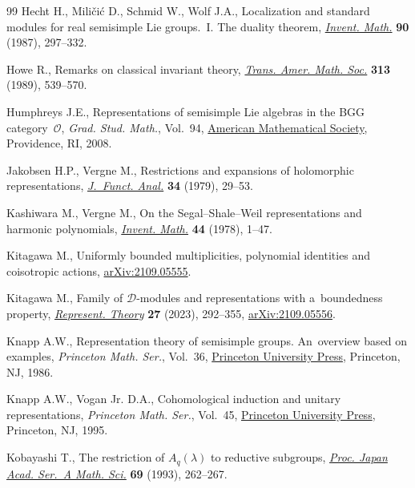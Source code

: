 \documentclass[10pt,a4paper]{amsart}
\numberwithin{equation}{section}
\theoremstyle{definition}
\begin{document}
\begin{thebibliography}{99}
Hecht H., Mili\v{c}i\'c D., Schmid W., Wolf J.A., Localization and standard
 modules for real semisimple {L}ie groups.~{I}. {T}he duality theorem,
 \href{https://doi.org/10.1007/BF01388707}{\textit{Invent. Math.}} \textbf{90}
 (1987), 297--332.

Howe R., Remarks on classical invariant theory,
 \href{https://doi.org/10.2307/2001418}{\textit{Trans. Amer. Math. Soc.}}
 \textbf{313} (1989), 539--570.

Humphreys J.E., Representations of semisimple {L}ie algebras in the {BGG}
 category~{$\mathcal{O}$}, \textit{Grad. Stud. Math.}, Vol.~94,
 \href{https://doi.org/10.1090/gsm/094}{American Mathematical Society},
 Providence, RI, 2008.

Jakobsen H.P., Vergne M., Restrictions and expansions of holomorphic
 representations,
 \href{https://doi.org/10.1016/0022-1236(79)90023-5}{\textit{J.~Funct. Anal.}}
 \textbf{34} (1979), 29--53.

Kashiwara M., Vergne M., On the {S}egal--{S}hale--{W}eil representations and
 harmonic polynomials,
 \href{https://doi.org/10.1007/BF01389900}{\textit{Invent. Math.}} \textbf{44}
 (1978), 1--47.

Kitagawa M., Uniformly bounded multiplicities, polynomial identities and
 coisotropic actions,
 \href{http://arxiv.org/abs/2109.05555}{arXiv:2109.05555}.

Kitagawa M., Family of {$\mathcal{D}$}-modules and representations with
 a~boundedness property,
 \href{https://doi.org/10.1090/ert/641}{\textit{Represent. Theory}}
 \textbf{27} (2023), 292--355,
 \href{http://arxiv.org/abs/2109.05556}{arXiv:2109.05556}.

Knapp A.W., Representation theory of semisimple groups. An~overview based on
 examples, \textit{Princeton Math. Ser.}, Vol.~36,
 \href{https://doi.org/10.1515/9781400883974}{Princeton University Press},
 Princeton, NJ, 1986.

Knapp A.W., Vogan Jr. D.A., Cohomological induction and unitary
 representations, \textit{Princeton Math. Ser.}, Vol.~45,
 \href{https://doi.org/10.1515/9781400883936}{Princeton University Press},
 Princeton, NJ, 1995.

Kobayashi T., The restriction of {$A_q(\lambda)$} to reductive subgroups,
 \href{https://doi.org/10.3792/pjaa.69.262}{\textit{Proc. Japan Acad. Ser.~A
 Math. Sci.}} \textbf{69} (1993), 262--267.


\end{thebibliography}
\end{document}
